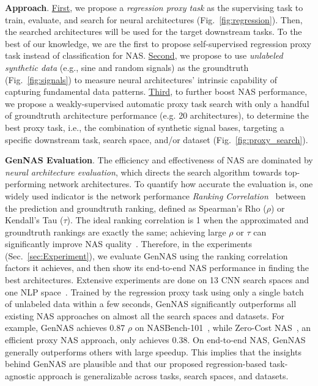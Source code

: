 \documentclass{article}
\begin{document}
\textbf{Approach}. \underline{First}, we propose a \textit{regression proxy task} as the supervising task to train, evaluate, and search for neural architectures (Fig.~\ref{fig:regression}). Then, the searched architectures will be used for the target downstream tasks.
To the best of our knowledge, we are the first to propose self-supervised regression proxy task instead of classification for NAS.
\underline{Second}, we propose to use \textit{unlabeled synthetic data} (e.g., sine and random signals) as the groundtruth (Fig.~\ref{fig:signals}) to measure neural architectures' intrinsic capability of capturing fundamental data patterns.
\underline{Third}, to further boost NAS performance, we propose a weakly-supervised automatic proxy task search with only a handful of groundtruth architecture performance (e.g. 20 architectures), to determine the best proxy task, i.e., the combination of synthetic signal bases, targeting a specific downstream task, search space, and/or dataset (Fig.~\ref{fig:proxy_search}).


\textbf{GenNAS Evaluation}.
The efficiency and effectiveness of NAS are dominated by \textit{neural architecture evaluation}, which directs the search algorithm towards  top-performing network architectures.
To quantify how accurate the evaluation is, one widely used indicator is the network performance \textit{Ranking Correlation}~\cite{daniel1990applied} between the prediction and groundtruth ranking, defined as Spearman's Rho ($\rho$) or Kendall's Tau ($\tau$). 
The ideal ranking correlation is 1 when the approximated and groundtruth rankings are exactly the same; achieving large $\rho$ or $\tau$ can significantly improve NAS quality~\cite{zhou2020econas, chu2019fairnas, li2020random}.
Therefore, in the experiments (Sec.~\ref{sec:Experiment}), we evaluate GenNAS using the ranking correlation factors it achieves, and then show its end-to-end NAS performance in finding the best architectures.
Extensive experiments are done on 13 CNN search spaces and one NLP space~\cite{klyuchnikov2020bench}.
Trained by the regression proxy task using only a single batch of unlabeled data within a few seconds, GenNAS significantly outperforms all existing NAS approaches on almost all the search spaces and datasets.
For example, GenNAS achieves 0.87 $\rho$ on NASBench-101~\cite{ying2019bench}, while Zero-Cost NAS~\cite{abdelfattah2021zero}, an efficient proxy NAS approach, only achieves 0.38.
On end-to-end NAS, GenNAS generally outperforms others with large speedup.
This implies that the insights behind GenNAS are plausible and that our proposed regression-based task-agnostic approach is generalizable across tasks, search spaces, and datasets.
\vspace{-5pt}
\end{document}

